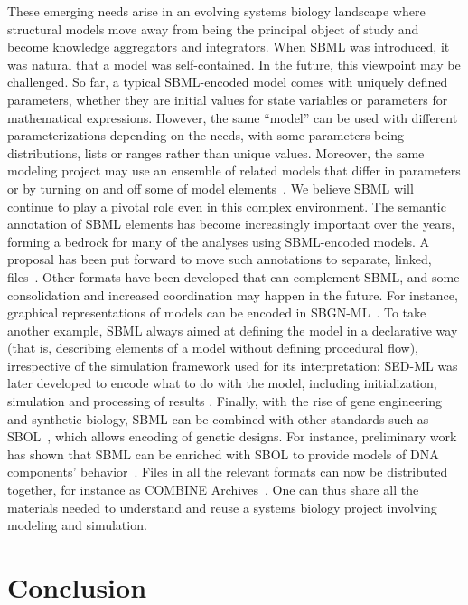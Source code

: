 \documentclass[]{draft-sbml-paper}
\begin{document}
These emerging needs arise in an evolving systems biology landscape where structural models move away from being the principal object of study and become knowledge aggregators and integrators. When SBML was introduced, it was natural that a model was self-contained. In the future, this viewpoint may be challenged. So far, a typical SBML-encoded model comes with uniquely defined parameters, whether they are initial values for state variables or parameters for mathematical expressions. However, the same ``model'' can be used with different parameterizations depending on the needs, with some parameters being distributions, lists or ranges rather than unique values. Moreover, the same modeling project may use an ensemble of related models that differ in parameters or by turning on and off some of model elements~\citep{kuepfer2007ensemble, waltemath2016toward}. We believe SBML will continue to play a pivotal role even in this complex environment. The semantic annotation of SBML elements has become increasingly important over the years, forming a bedrock for many of the analyses using SBML-encoded models.  A proposal has been put forward to move such annotations to separate, linked, files~\citep{Neal2018}. Other formats have been developed that can complement SBML, and some consolidation and increased coordination may happen in the future. For instance, graphical representations of models can be encoded in SBGN-ML~\citep{VanIersel2012}.  To take another example, SBML always aimed at defining the model in a declarative way (that is, describing elements of a model without defining procedural flow), irrespective of the simulation framework used for its interpretation;  SED-ML was later developed to encode what to do with the model, including initialization, simulation and processing of results \citep{waltemath2011reproducible}. Finally, with the rise of gene engineering and synthetic biology, SBML can be combined with other standards such as SBOL~\citep{galdzicki_2014}, which allows encoding of genetic designs. For instance, preliminary work has shown that SBML can be enriched with SBOL to provide models of DNA components' behavior~\citep{Roehner2014a}. Files in all the relevant formats can now be distributed together, for instance as COMBINE Archives~\citep{bergmann2014combine}. One can thus share all the materials needed to understand and reuse a systems biology project involving modeling and simulation.


\section*{Conclusion}
\end{document}

